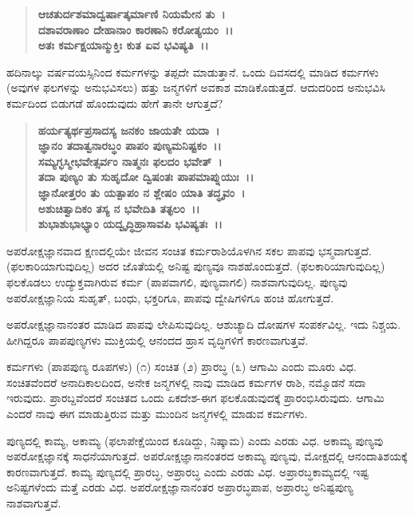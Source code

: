 \begin{verse}
\textbf{ಆಚತುರ್ದಶಮಾದ್ವರ್ಷಾತ್ಕರ್ಮಾಣಿ ನಿಯಮೇನ ತು~।}\\\textbf{ದಶಾವರಾಣಾಂ ದೇಹಾನಾಂ ಕಾರಣಾನಿ ಕರೋತ್ಯಯಂ~।।}\\\textbf{ಅತಃ ಕರ್ಮಕ್ಷಯಾನ್ಮುಕ್ತಿಃ ಕುತ ಏವ ಭವಿಷ್ಯತಿ~।।}
\end{verse}

ಹದಿನಾಲ್ಕು ವರ್ಷವಯಸ್ಸಿನಿಂದ ಕರ್ಮಗಳನ್ನು ತಪ್ಪದೇ ಮಾಡುತ್ತಾನೆ. ಒಂದು ದಿವಸದಲ್ಲಿ ಮಾಡಿದ ಕರ್ಮಗಳು (ಅವುಗಳ ಫಲಗಳನ್ನು ಅನುಭವಿಸಲು) ಹತ್ತು ಜನ್ಮಗಳಿಗೆ ಅವಕಾಶ ಮಾಡಿಕೊಡುತ್ತದೆ. ಆದುದರಿಂದ ಅನುಭವಿಸಿ ಕರ್ಮದಿಂದ ಬಿಡುಗಡೆ ಹೊಂದುವುದು ಹೇಗೆ ತಾನೇ ಆಗುತ್ತದೆ?

\begin{verse}
\textbf{ಹರ್ಯತ್ಯರ್ಥಪ್ರಸಾದಸ್ಯ ಜನಕಂ ಜಾಯತೇ ಯದಾ~।}\\\textbf{ಜ್ಞಾನಂ ತದಾತ್ವನಾರಬ್ಧಂ ಪಾಪಂ ಪುಣ್ಯಮನಿಷ್ಟಕಂ~।।}\\\textbf{ಸಮ್ಯಗ್ಭಸ್ಮೀಭವೇತ್ಸರ್ವಂ ನಾತ್ಮನಃ ಫಲದಂ ಭವೇತ್~।}\\\textbf{ತದಾ ಪುಣ್ಯಂ ತು ಸುಹೃದೋ ದ್ವಿಷಂತಃ ಪಾಪಮಾಪ್ನುಯುಃ~।।}\\\textbf{ಜ್ಞಾನೋತ್ತರಂ ತು ಯತ್ಪಾಪಂ ನ ಶ್ಲೇಷಂ ಯಾತಿ ತದ್ಧೃವಂ~।}\\\textbf{ಅಶುಚಿತ್ವಾದಿಕಂ ತಸ್ಯ ನ ಭವೇದಿತಿ ತತ್ಫಲಂ~।।}\\\textbf{ಶುಭಾಶುಭಾಭ್ಯಾಂ ಯದ್ವೃದ್ಧಿಹ್ರಾಸಾವಪಿ ಭವಿಷ್ಯತಃ~।।}
\end{verse}


ಅಪರೋಕ್ಷಜ್ಞಾನವಾದ ಕ್ಷಣದಲ್ಲಿಯೇ ಜೀವನ ಸಂಚಿತ ಕರ್ಮರಾಶಿಯೊಳಗಿನ ಸಕಲ ಪಾಪವು ಭಸ್ಮವಾಗುತ್ತದೆ. (ಫಲಕಾರಿಯಾಗುವುದಿಲ್ಲ) ಅದರ ಜೊತೆಯಲ್ಲಿ ಅನಿಷ್ಟ ಪುಣ್ಯವೂ ನಾಶಹೊಂದುತ್ತದೆ. (ಫಲಕಾರಿಯಾಗುವುದಿಲ್ಲ) ಫಲಕೊಡಲು ಉದ್ಯುಕ್ತವಾಗಿರುವ ಕರ್ಮ (ಪಾಪವಾಗಲಿ, ಪುಣ್ಯವಾಗಲಿ) ನಾಶವಾಗುವುದಿಲ್ಲ. ಪುಣ್ಯವು ಅಪರೋಕ್ಷಜ್ಞಾನಿಯ ಸುಹೃತ್, ಬಂಧು, ಭಕ್ತರಿಗೂ, ಪಾಪವು ದ್ವೇಷಿಗಳಿಗೂ ಹಂಚಿ ಹೋಗುತ್ತದೆ.

ಅಪರೋಕ್ಷಜ್ಞಾನಾನಂತರ ಮಾಡಿದ ಪಾಪವು ಲೇಪಿಸುವುದಿಲ್ಲ. ಆಶುಚ್ಯಾದಿ ದೋಷಗಳ ಸಂಪರ್ಕವಿಲ್ಲ. ಇದು ನಿಶ್ಚಯ. ಹೀಗಿದ್ದರೂ ಪಾಪಪುಣ್ಯಗಳು ಮುಕ್ತಿಯಲ್ಲಿ ಆನಂದದ ಹ್ರಾಸ ವೃದ್ಧಿಗಳಿಗೆ ಕಾರಣವಾಗುತ್ತವೆ.

ಕರ್ಮಗಳು (ಪಾಪಪುಣ್ಯ ರೂಪಗಳು) (೧) ಸಂಚಿತ (೨) ಪ್ರಾರಬ್ಧ (೩) ಆಗಾಮಿ ಎಂದು ಮೂರು ವಿಧ. ಸಂಚಿತವೆಂದರೆ ಅನಾದಿಕಾಲದಿಂದ, ಅನೇಕ ಜನ್ಮಗಳಲ್ಲಿ ನಾವು ಮಾಡಿದ ಕರ್ಮಗಳ ರಾಶಿ, ನಮ್ಮೊಡನೆ ಸದಾ ಇರುವುದು. ಪ್ರಾರಬ್ದವೆಂದರೆ ಸಂಚಿತದ ಒಂದು ಏಕದೇಶ-ಈಗ ಫಲಕೊಡುವುದಕ್ಕೆ ಪ್ರಾರಂಭಿಸಿರುವುದು. ಆಗಾಮಿ ಎಂದರೆ ನಾವು ಈಗ ಮಾಡುತ್ತಿರುವ ಮತ್ತು ಮುಂದಿನ ಜನ್ಮಗಳಲ್ಲಿ ಮಾಡುವ ಕರ್ಮಗಳು.

ಪುಣ್ಯದಲ್ಲಿ ಕಾಮ್ಯ, ಅಕಾಮ್ಯ (ಫಲಾಪೇಕ್ಷೆಯಿಂದ ಕೂಡಿದ್ದು, ನಿಷ್ಕಾಮ) ಎಂದು ಎರಡು ವಿಧ. ಅಕಾಮ್ಯ ಪುಣ್ಯವು ಅಪರೋಕ್ಷಜ್ಞಾನಕ್ಕೆ ಸಾಧನೆಯಾಗುತ್ತದೆ. ಅಪರೋಕ್ಷಜ್ಞಾನಾನಂತರದ ಅಕಾಮ್ಯ ಪುಣ್ಯವು, ಮೋಕ್ಷದಲ್ಲಿ ಆನಂದಾತಿಶಯಕ್ಕೆ ಕಾರಣವಾಗುತ್ತದೆ. ಕಾಮ್ಯ ಪುಣ್ಯದಲ್ಲಿ ಪ್ರಾರಬ್ಧ, ಅಪ್ರಾರಬ್ಧ ಎಂದು ಎರಡು ವಿಧ. ಅಪ್ರಾರಬ್ಧಕಾಮ್ಯದಲ್ಲಿ ಇಷ್ಟ ಅನಿಷ್ಟಗಳೆಂದು ಮತ್ತೆ ಎರಡು ವಿಧ. ಅಪರೋಕ್ಷಜ್ಞಾನಾನಂತರ ಅಪ್ರಾರಬ್ಧಪಾಪ, ಅಪ್ರಾರಬ್ಧ ಅನಿಷ್ಟಪುಣ್ಯ ನಾಶವಾಗುತ್ತವೆ.

